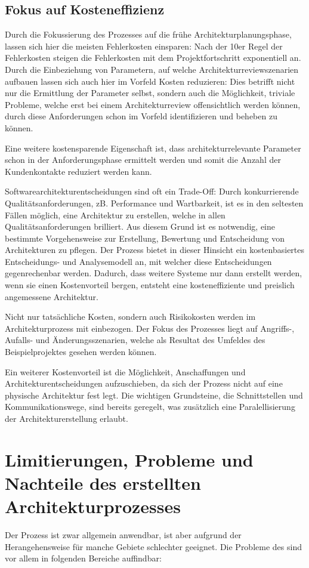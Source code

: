 \subsection{Fokus auf Kosteneffizienz}
Durch die Fokussierung des Prozesses auf die frühe Architekturplanungsphase, lassen sich hier die meisten Fehlerkosten einsparen: Nach der 10er Regel der Fehlerkosten steigen die Fehlerkosten mit dem Projektfortschritt exponentiell an. Durch die Einbeziehung von Parametern, auf welche  Architekturreviewszenarien aufbauen lassen sich auch hier im Vorfeld Kosten reduzieren: Dies betrifft nicht nur die Ermittlung der Parameter selbst, sondern auch die Möglichkeit, triviale Probleme, welche erst bei einem Architekturreview offensichtlich werden können, durch diese Anforderungen schon im Vorfeld identifizieren und beheben zu können.

Eine weitere kostensparende Eigenschaft ist, dass architekturrelevante Parameter schon in der Anforderungsphase ermittelt werden und somit die Anzahl der Kundenkontakte reduziert werden kann.

Softwarearchitekturentscheidungen sind oft ein Trade-Off: Durch konkurrierende Qualitätsanforderungen, zB. Performance und Wartbarkeit, ist es in den seltesten Fällen möglich, eine Architektur zu erstellen, welche in allen Qualitätsanforderungen brilliert. Aus diesem Grund ist es notwendig, eine bestimmte Vorgehensweise zur Erstellung, Bewertung und Entscheidung von Architekturen zu pflegen. Der Prozess bietet in dieser Hinsicht ein kostenbasiertes Entscheidungs- und Analysemodell an, mit welcher diese Entscheidungen gegenrechenbar werden. Dadurch, dass weitere Systeme nur dann erstellt werden, wenn sie einen Kostenvorteil bergen, entsteht eine kosteneffiziente und preislich angemessene Architektur.

Nicht nur tatsächliche Kosten, sondern auch Risikokosten werden im Architekturprozess mit einbezogen. Der Fokus des Prozesses liegt auf Angriffs-, Aufalls- und Änderungsszenarien, welche als Resultat des Umfeldes des Beispielprojektes gesehen werden können.

Ein weiterer Kostenvorteil ist die Möglichkeit, Anschaffungen und Architekturentscheidungen aufzuschieben, da sich der Prozess nicht auf eine physische Architektur fest legt. Die wichtigen Grundsteine, die Schnittstellen und Kommunikationswege, sind bereits geregelt, was zusätzlich eine Paralellisierung der Architekturerstellung erlaubt.


\section{Limitierungen, Probleme und Nachteile des erstellten Architekturprozesses}
Der Prozess ist zwar allgemein anwendbar, ist aber aufgrund der Herangehensweise für manche Gebiete schlechter geeignet. Die Probleme des sind vor allem in folgenden Bereiche auffindbar:

